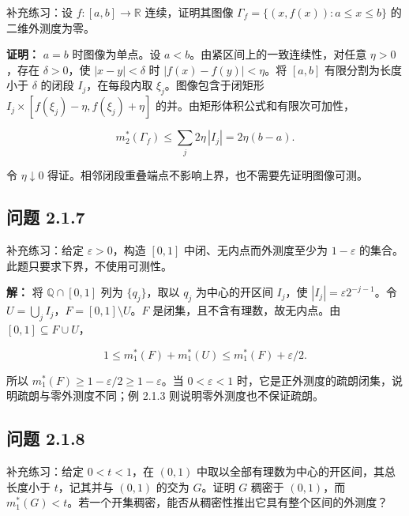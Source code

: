 \documentclass[11pt,a4paper]{article}
\begin{document}
补充练习：设 \(f:[a,b]\to\mathbb R\) 连续，证明其图像
\(\Gamma_f=\{(x,f(x)):a\le x\le b\}\) 的二维外测度为零。

\textbf{证明：} \(a=b\) 时图像为单点。设
\(a<b\)。由紧区间上的一致连续性，对任意 \(\eta>0\)，存在
\(\delta>0\)，使 \(|x-y|<\delta\) 时 \(|f(x)-f(y)|<\eta\)。将 \([a,b]\)
有限分割为长度小于 \(\delta\) 的闭段 \(I_j\)，在每段内取
\(\xi_j\)。图像包含于闭矩形 \(I_j\times[f(\xi_j)-\eta,f(\xi_j)+\eta]\)
的并。由矩形体积公式和有限次可加性，

\begin{equation*}
m_2^*(\Gamma_f)\le\sum_j2\eta\,|I_j|=2\eta(b-a).
\tag{2.1.26}
\end{equation*}

令 \(\eta\downarrow0\)
得证。相邻闭段重叠端点不影响上界，也不需要先证明图像可测。

\subsection{问题 2.1.7}\label{ux95eeux9898-2.1.7}

补充练习：给定 \(\varepsilon>0\)，构造 \([0,1]\)
中闭、无内点而外测度至少为 \(1-\varepsilon\)
的集合。此题只要求下界，不使用可测性。

\textbf{解：} 将 \(\mathbb Q\cap[0,1]\) 列为 \(\{q_j\}\)，取以 \(q_j\)
为中心的开区间 \(I_j\)，使 \(|I_j|=\varepsilon2^{-j-1}\)。令
\(U=\bigcup_jI_j\)，\(F=[0,1]\setminus U\)。\(F\)
是闭集，且不含有理数，故无内点。由 \([0,1]\subseteq F\cup U\)，

\begin{equation*}
1\le m_1^*(F)+m_1^*(U)\le m_1^*(F)+\varepsilon/2.
\tag{2.1.27}
\end{equation*}

所以 \(m_1^*(F)\ge1-\varepsilon/2\ge1-\varepsilon\)。当
\(0<\varepsilon<1\)
时，它是正外测度的疏朗闭集，说明疏朗与零外测度不同；例 2.1.3
则说明零外测度也不保证疏朗。

\subsection{问题 2.1.8}\label{ux95eeux9898-2.1.8}

补充练习：给定 \(0<t<1\)，在 \((0,1)\)
中取以全部有理数为中心的开区间，其总长度小于 \(t\)，记其并与 \((0,1)\)
的交为 \(G\)。证明 \(G\) 稠密于 \((0,1)\)，而
\(m_1^*(G)<t\)。若一个开集稠密，能否从稠密性推出它具有整个区间的外测度？
\end{document}
